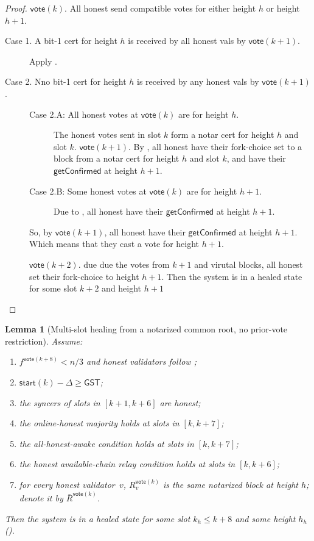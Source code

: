 \documentclass{article}
\newcommand{\start}{\mathsf{start}}
\newcommand{\vote}{\mathsf{vote}}
\newcommand{\comm}[1]{\bar{#1}}
\newcommand{\getConfirmed}{\textsf{getConfirmed}\xspace}
\theoremstyle{plain}
\newtheorem{lemma}{Lemma}
\theoremstyle{definition}
\theoremstyle{remark}
\newcommand{\GST}{\ensuremath{\mathsf{GST}}}
\newcommand{\OHM}{online-honest majority\xspace}
\newcommand{\HAR}{honest available-chain relay\xspace}
\newcommand{\AHA}{all-honest-awake\xspace}
\begin{document}
\begin{proof}
{$\vote(k)$. All honest send compatible votes for either height $h$ or height $h+1$.

\begin{description}
  \item[Case 1. A bit-1 cert for height $h$ is received by all honest vals by $\vote(k+1)$.] 
  Apply .

  \item[Case 2. Nno bit-1 cert for height $h$ is received by any honest vals by $\vote(k+1)$.]\leavevmode
  \begin{description}
    \item[Case 2.A: All honest votes at $\vote(k)$ are for height $h$.]
    The honest votes sent in slot $k$ form a notar cert for height $h$ and slot $k$.
    $\vote(k+1)$. By , all honest have their fork-choice set to a  block from a notar cert for height $h$ and slot $k$, and have their $\getConfirmed$ at height $h+1$.

    \item[Case 2.B: Some honest votes at $\vote(k)$ are for height $h+1$.]
    Due to , all honest have their $\getConfirmed$ at height $h+1$. 
  \end{description}

  So, by $\vote(k+1)$,  all honest have their $\getConfirmed$ at height $h+1$. 
  Which means that they cast a vote for height $h+1$.

  $\vote(k+2)$. due due the votes from $k+1$ and virutal blocks, all honest set their fork-choice to height $h+1$.
  Then the system is in a healed state for some slot $k+2$ and height $h+1$ 

\end{description}}

\end{proof}
\begin{lemma}[Multi-slot healing from a notarized common root, no prior-vote restriction]\label{rev:lem:healing-from-notarized-multi-no-nh}
Assume:
\begin{enumerate}
  \item\label{rev:hfnmnn:f} $f^{\vote(k+8)} < n/3$ and honest validators follow ;
  \item\label{rev:hfnmnn:sync} $\start(k) - \Delta \geq \GST$;
  \item\label{rev:hfnmnn:syncers} the syncers of slots in $[k+1, k+6]$ are honest;
  \item\label{rev:hfnmnn:ohm} the \OHM holds at slots in $[k, k+7]$;
  \item\label{rev:hfnmnn:aha} the \AHA condition holds at slots in $[k, k+7]$;
  \item\label{rev:hfnmnn:har} the \HAR condition holds at slots in $[k, k+6]$;
  \item\label{rev:hfnmnn:r} for every honest validator~$v$, $R_v^{\vote(k)}$ is the same notarized block at height $h$; denote it by $\comm{R}^{\vote(k)}$.
\end{enumerate}
Then the system is in a healed state for some slot $k_h \leq k+8$ and some height $h_h$ ().
\end{lemma}
\end{document}
